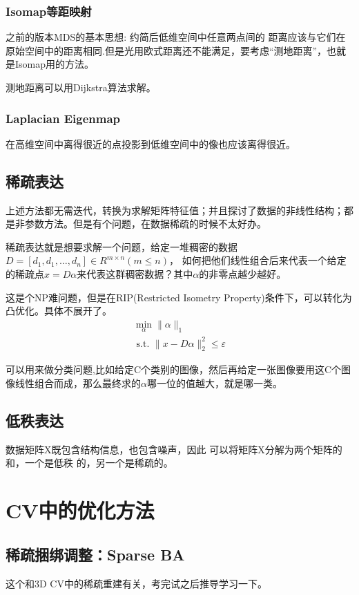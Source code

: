 \documentclass[12pt]{article}
\begin{document}
\subsubsection{Isomap等距映射}
之前的版本MDS的基本思想: 约简后低维空间中任意两点间的 距离应该与它们在原始空间中的距离相同.但是光用欧式距离还不能满足，要考虑“测地距离”，也就是Isomap用的方法。

测地距离可以用Dijkstra算法求解。

\subsubsection{Laplacian Eigenmap}
在高维空间中离得很近的点投影到低维空间中的像也应该离得很近。

\subsection{稀疏表达}
上述方法都无需迭代，转换为求解矩阵特征值；并且探讨了数据的非线性结构；都是非参数方法。但是有个问题，在数据稀疏的时候不太好办。

稀疏表达就是想要求解一个问题，给定一堆稠密的数据$D=\left[d_{1}, d_{1}, \ldots, d_{n}\right] \in R^{m \times n}(m \leq n)$，
如何把他们线性组合后来代表一个给定的稀疏点$x=D\alpha$来代表这群稠密数据？其中$\alpha$的非零点越少越好。

这是个NP难问题，但是在RIP(Restricted Isometry Property)条件下，可以转化为凸优化。具体不展开了。
\begin{equation}
    \nonumber
    \begin{array}{l}
        \min _{\alpha}\|\alpha\|_{1} \\
        \text { s.t. }\|x-D \alpha\|_{2}^{2} \leq \varepsilon
        \end{array}
\end{equation}

可以用来做分类问题,比如给定C个类别的图像，然后再给定一张图像要用这C个图像线性组合而成，那么最终求的$\alpha$哪一位的值越大，就是哪一类。

\subsection{低秩表达}
数据矩阵X既包含结构信息，也包含噪声，因此
可以将矩阵X分解为两个矩阵的和，一个是低秩 的，另一个是稀疏的。

\section{CV中的优化方法}
\subsection{稀疏捆绑调整：Sparse BA}
这个和3D CV中的稀疏重建有关，考完试之后推导学习一下。
\end{document}

